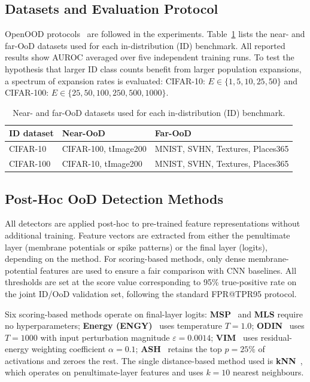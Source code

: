 \documentclass{ieeeaccess}
\begin{document}
\subsection{Datasets and Evaluation Protocol}
OpenOOD protocols~\cite{yang2022openood} are followed in the experiments. Table~\ref{tab:ood-datasets} lists the near- and far-OoD datasets used for each in-distribution (ID) benchmark. All reported results show AUROC averaged over five independent training runs. To test the hypothesis that larger ID class counts benefit from larger population expansions, a spectrum of expansion rates is evaluated: CIFAR-10: $E \in \{1, 5, 10, 25, 50\}$ and CIFAR-100: $E \in \{25, 50, 100, 250, 500, 1000\}$.

\begin{table}[tbp]
\caption{Near- and far-OoD datasets used for each in-distribution (ID) benchmark.}
\begin{center}
\small
\begin{tabular}{l p{2.75cm} p{2.75cm}}
\toprule
\textbf{ID dataset} & \textbf{Near-OoD} & \textbf{Far-OoD} \\
\midrule
CIFAR-10 & CIFAR-100, tImage200 & MNIST, SVHN, Textures, Places365 \\
CIFAR-100 & CIFAR-10, tImage200 & MNIST, SVHN, Textures, Places365 \\
\bottomrule
\end{tabular}
\label{tab:ood-datasets}
\end{center}
\end{table}

\subsection{Post-Hoc OoD Detection Methods}
All detectors are applied post-hoc to pre-trained feature representations without additional training. Feature vectors are extracted from either the penultimate layer (membrane potentials or spike patterns) or the final layer (logits), depending on the method. For scoring-based methods, only dense membrane-potential features are used to ensure a fair comparison with CNN baselines. All thresholds are set at the score value corresponding to 95\% true-positive rate on the joint ID/OoD validation set, following the standard FPR@TPR95 protocol.

Six scoring-based methods operate on final-layer logits: \textbf{MSP}~\cite{hendrycks2017baseline} and \textbf{MLS} require no hyperparameters; \textbf{Energy (ENGY)}~\cite{liu2020energy} uses temperature $T=1.0$; \textbf{ODIN}~\cite{liang2018enhancing} uses $T=1000$ with input perturbation magnitude $\varepsilon=0.0014$; \textbf{VIM}~\cite{wang2022vim} uses residual-energy weighting coefficient $\alpha=0.1$; \textbf{ASH}~\cite{djurisic2022ash} retains the top $p=25\%$ of activations and zeroes the rest. The single distance-based method used is \textbf{kNN}~\cite{sun2022knn}, which operates on penultimate-layer features and uses $k=10$ nearest neighbours.
\end{document}
